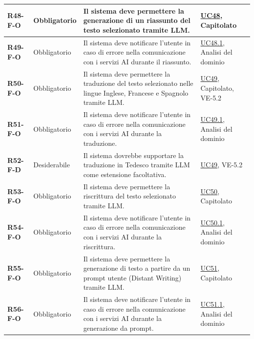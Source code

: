 \begin{longtable}{|p{2.5cm}|p{2.2cm}|p{6.8cm}|p{2.7cm}|}
	\textbf{R48-F-O} & Obbligatorio & Il sistema deve permettere la generazione di un riassunto del testo selezionato tramite LLM. & \hyperlink{uc48}{UC48}, Capitolato \\ \hline
	\textbf{R49-F-O} & Obbligatorio & Il sistema deve notificare l'utente in caso di errore nella comunicazione con i servizi AI durante il riassunto. & \hyperlink{uc48.1}{UC48.1}, Analisi del dominio \\ \hline
	\textbf{R50-F-O} & Obbligatorio & Il sistema deve permettere la traduzione del testo selezionato nelle lingue Inglese, Francese e Spagnolo tramite LLM. & \hyperlink{uc49}{UC49}, Capitolato, VE-5.2 \\ \hline
	\textbf{R51-F-O} & Obbligatorio & Il sistema deve notificare l'utente in caso di errore nella comunicazione con i servizi AI durante la traduzione. & \hyperlink{uc49.1}{UC49.1}, Analisi del dominio \\ \hline
	\textbf{R52-F-D} & Desiderabile & Il sistema dovrebbe supportare la traduzione in Tedesco tramite LLM come estensione facoltativa. & \hyperlink{uc49}{UC49}, VE-5.2 \\ \hline
	\textbf{R53-F-O} & Obbligatorio & Il sistema deve permettere la riscrittura del testo selezionato tramite LLM. & \hyperlink{uc50}{UC50}, Capitolato \\ \hline
	\textbf{R54-F-O} & Obbligatorio & Il sistema deve notificare l'utente in caso di errore nella comunicazione con i servizi AI durante la riscrittura. & \hyperlink{uc50.1}{UC50.1}, Analisi del dominio \\ \hline
	\textbf{R55-F-O} & Obbligatorio & Il sistema deve permettere la generazione di testo a partire da un prompt utente (Distant Writing) tramite LLM. & \hyperlink{uc51}{UC51}, Capitolato \\ \hline
	\textbf{R56-F-O} & Obbligatorio & Il sistema deve notificare l'utente in caso di errore nella comunicazione con i servizi AI durante la generazione da prompt. & \hyperlink{uc51.1}{UC51.1}, Analisi del dominio \\ \hline


\end{longtable}
